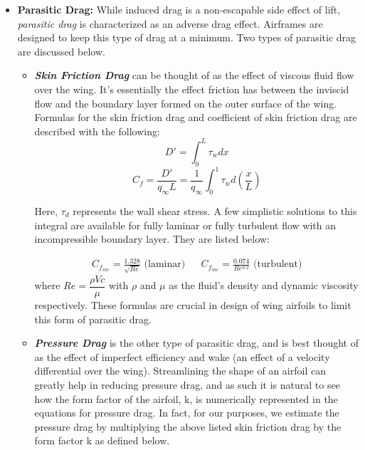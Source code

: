 \documentclass{article}
\begin{document}
\begin{itemize}
\begin{itemize}
            \item \textbf{Parasitic Drag:} While induced drag is a non-escapable side effect of lift, \textit{parasitic drag}
            is characterized as an adverse drag effect. Airframes are designed to keep this type of drag at a minimum. Two
            types of parasitic drag are discussed below.
            
                \begin{itemize}
                    \item \textbf{\textit{Skin Friction Drag}} can be thought of as the effect of viscous fluid flow
                    over the wing. It's essentially the effect friction has between the inviscid flow and the boundary layer formed on
                    the outer surface of the wing. Formulas for the skin friction drag and coefficient of skin friction drag are described with the following:
                    \begin{equation}
                    D' = \int_{0}^{L} \tau_w dx
                    \end{equation}
                    \begin{equation}
                    C_f = \frac{D'}{q_{\infty}L} = \frac{1}{q_{\infty}} \int_{0}^{1} \tau_w d \left(\frac{x}{L}\right)
                    \end{equation}

                    Here, $\tau_d$ represents the wall shear stress. A few simplistic solutions to this integral are
                    available for fully laminar or fully turbulent flow with an incompressible boundary layer. They are listed below:

                    \begin{align*}
                    C_{f_{inc}} = \frac{1.328}{\sqrt{Re}} \text{ (laminar)} && C_{f_{inc}} = \frac{0.074}{Re^{0.2}} \text{ (turbulent)}
                    \end{align*}
                    where $Re = \dfrac{\rho V c}{\mu}$ with $\rho$ and $\mu$ as the fluid's density and dynamic viscosity respectively.
                    These formulas are crucial in design of wing airfoils to limit this form of parasitic drag.
                    
                    \item \textbf{\textit{Pressure Drag}} is the other type of parasitic drag, and is best thought of as the effect of
                    imperfect efficiency and wake (an effect of a velocity differential over the wing). Streamlining the shape of an airfoil
                    can greatly help in reducing pressure drag, and as such it is natural to see how the form factor of the airfoil, k, is
                    numerically represented in the equations for pressure drag. In fact, for our purposes, we estimate the pressure drag by 
                    multiplying the above listed skin friction drag by the form factor k as defined below.
                    

\end{itemize}
\end{itemize}
\end{itemize}
\end{document}
